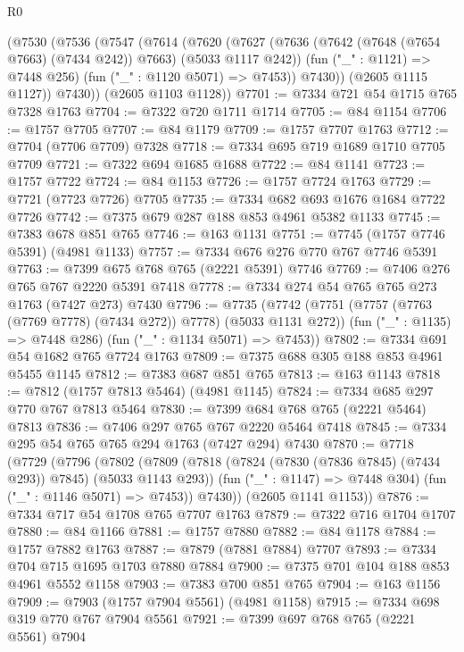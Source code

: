 \begin{lexlean}{R0}
\begin{coremodule}
      (@7530
        (@7536
          (@7547
            (@7614
              (@7620
                (@7627
                  (@7636 (@7642 (@7648 (@7654 @7663) (@7434 @242)) @7663) (@5033 @1117 @242))
                  (fun ("_" : @1121) => @7448 @256)
                  (fun ("_" : @1120 @5071) => @7453))
                @7430))
            (@2605 @1115 @1127))
          @7430))
      (@2605 @1103 @1128))
@7701 := @7334 @721 @54 @1715 @765 @7328 @1763
@7704 := @7322 @720 @1711 @1714
@7705 := @84 @1154
@7706 := @1757 @7705
@7707 := @84 @1179
@7709 := @1757 @7707 @1763
@7712 := @7704 (@7706 @7709) @7328
@7718 := @7334 @695 @719 @1689 @1710 @7705 @7709
@7721 := @7322 @694 @1685 @1688
@7722 := @84 @1141
@7723 := @1757 @7722
@7724 := @84 @1153
@7726 := @1757 @7724 @1763
@7729 := @7721 (@7723 @7726) @7705
@7735 := @7334 @682 @693 @1676 @1684 @7722 @7726
@7742 := @7375 @679 @287 @188 @853 @4961 @5382 @1133
@7745 := @7383 @678 @851 @765
@7746 := @163 @1131
@7751 := @7745 (@1757 @7746 @5391) (@4981 @1133)
@7757 := @7334 @676 @276 @770 @767 @7746 @5391
@7763 := @7399 @675 @768 @765 (@2221 @5391) @7746
@7769 := @7406 @276 @765 @767 @2220 @5391 @7418
@7778 := @7334 @274 @54 @765 @765 @273 @1763 (@7427 @273) @7430
@7796 := @7735
    (@7742
      (@7751 (@7757 (@7763 (@7769 @7778) (@7434 @272)) @7778) (@5033 @1131 @272))
      (fun ("_" : @1135) => @7448 @286)
      (fun ("_" : @1134 @5071) => @7453))
@7802 := @7334 @691 @54 @1682 @765 @7724 @1763
@7809 := @7375 @688 @305 @188 @853 @4961 @5455 @1145
@7812 := @7383 @687 @851 @765
@7813 := @163 @1143
@7818 := @7812 (@1757 @7813 @5464) (@4981 @1145)
@7824 := @7334 @685 @297 @770 @767 @7813 @5464
@7830 := @7399 @684 @768 @765 (@2221 @5464) @7813
@7836 := @7406 @297 @765 @767 @2220 @5464 @7418
@7845 := @7334 @295 @54 @765 @765 @294 @1763 (@7427 @294) @7430
@7870 := @7718
    (@7729
      (@7796
        (@7802
          (@7809
            (@7818 (@7824 (@7830 (@7836 @7845) (@7434 @293)) @7845) (@5033 @1143 @293))
            (fun ("_" : @1147) => @7448 @304)
            (fun ("_" : @1146 @5071) => @7453))
          @7430))
      (@2605 @1141 @1153))
@7876 := @7334 @717 @54 @1708 @765 @7707 @1763
@7879 := @7322 @716 @1704 @1707
@7880 := @84 @1166
@7881 := @1757 @7880
@7882 := @84 @1178
@7884 := @1757 @7882 @1763
@7887 := @7879 (@7881 @7884) @7707
@7893 := @7334 @704 @715 @1695 @1703 @7880 @7884
@7900 := @7375 @701 @104 @188 @853 @4961 @5552 @1158
@7903 := @7383 @700 @851 @765
@7904 := @163 @1156
@7909 := @7903 (@1757 @7904 @5561) (@4981 @1158)
@7915 := @7334 @698 @319 @770 @767 @7904 @5561
@7921 := @7399 @697 @768 @765 (@2221 @5561) @7904

\end{coremodule}
\end{lexlean}
